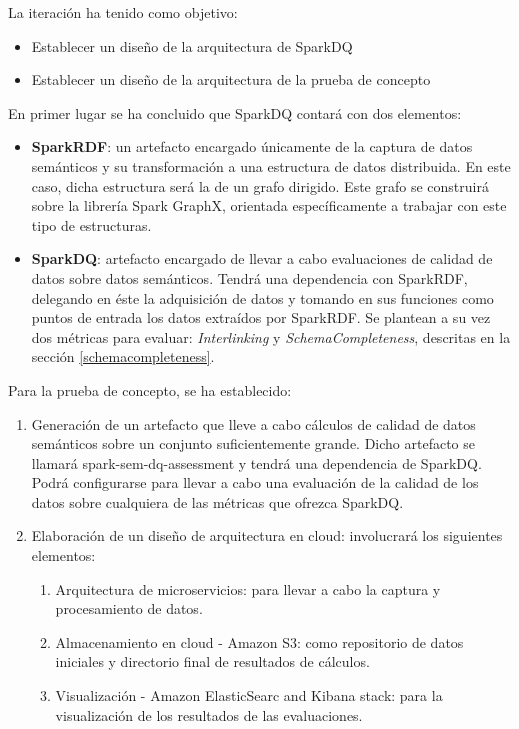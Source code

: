 

La iteración ha tenido como objetivo:

\begin{itemize}
\item Establecer un diseño de la arquitectura de SparkDQ
\item Establecer un diseño de la arquitectura de la prueba de concepto
\end{itemize}

En primer lugar se ha concluido que SparkDQ contará con dos elementos:
\begin{itemize}
\item \textbf{SparkRDF}: un artefacto encargado únicamente de la captura de datos
  semánticos y su transformación a una estructura de datos distribuida. En este
  caso, dicha estructura será la de un grafo dirigido. Este grafo se construirá
  sobre la librería Spark GraphX, orientada específicamente a trabajar con este
  tipo de estructuras.
  \item \textbf{SparkDQ}: artefacto encargado de llevar a cabo evaluaciones de
    calidad de datos sobre datos semánticos. Tendrá una dependencia con
    SparkRDF, delegando en éste la adquisición de datos y tomando en sus
    funciones como puntos de entrada los datos extraídos por SparkRDF. Se
    plantean a su vez dos métricas para evaluar: \textit{Interlinking} y
    \textit{SchemaCompleteness}, descritas en la sección \ref{schemacompleteness}. 
\end{itemize}

Para la prueba de concepto, se ha establecido:

\begin{enumerate}
\item Generación de un artefacto que lleve a cabo cálculos de calidad de datos
  semánticos sobre un conjunto suficientemente grande. Dicho artefacto se
  llamará spark-sem-dq-assessment y tendrá una dependencia de SparkDQ. Podrá
  configurarse para llevar a cabo una evaluación de la calidad de los datos
  sobre cualquiera de las métricas que ofrezca SparkDQ.
\item Elaboración de un diseño de arquitectura en cloud: involucrará los
  siguientes elementos:
  \begin{enumerate}
  \item Arquitectura de microservicios: para llevar a cabo la captura y
    procesamiento de datos. 
  \item Almacenamiento en cloud - Amazon S3: como repositorio de datos iniciales
    y directorio final de resultados de cálculos.
  \item Visualización - Amazon ElasticSearc and Kibana stack: para la
    visualización de los resultados de las evaluaciones.  
  \end{enumerate}
\end{enumerate}

